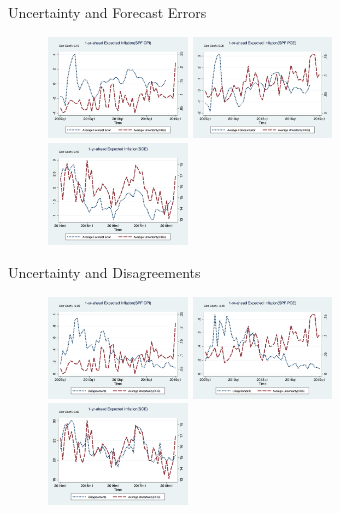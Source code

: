 \documentclass{beamer}
\begin{document}
\begin{frame}{Uncertainty and Forecast Errors}
\begin{figure}
	\centering
	\label{FEVar}
	\includegraphics[width=0.33\textwidth]{figuresDraft/SPFCPI_FE_varSPFCPIQ.png}
\includegraphics[width=0.33\textwidth]{figuresDraft/SPFPCE_FE_varSPFPCEQ.png}
\includegraphics[width=0.33\textwidth]{figuresDraft/SCE_FE_varSCEM.png}
\end{figure}
\end{frame}


\begin{frame}{Uncertainty and Disagreements}
\begin{figure}
	\centering
\label{DisgVar}
\includegraphics[width=0.33\textwidth]{figuresDraft/CPI_disg_varSPFCPIQ.png}
\includegraphics[width=0.33\textwidth]{figuresDraft/PCE_disg_varSPFPCEQ.png}
\includegraphics[width=0.33\textwidth]{figuresDraft/Q9_disg_varSCEM.png}
\end{figure}
\end{frame}
\end{document}
